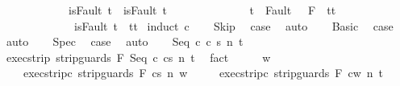 \begin{isabellebody}
\ \ \ \ \ \ \ \ \ \ \ \ {\isacharparenleft}isFault\ t\ {\isasymlongrightarrow}\ isFault\ t{\isacharprime}{\isacharparenright}\ {\isasymand}\ \isanewline
\ \ \ \ \ \ \ \ \ \ \ \ {\isacharparenleft}t{\isacharprime}\ {\isasymin}\ Fault\ {\isacharbackquote}\ {\isacharparenleft}{\isacharminus}\ F{\isacharparenright}\ {\isasymlongrightarrow}\ t{\isacharprime}{\isacharequal}t{\isacharparenright}\ {\isasymand}\isanewline
\ \ \ \ \ \ \ \ \ \ \ \ {\isacharparenleft}{\isasymnot}\ isFault\ t{\isacharprime}\ {\isasymlongrightarrow}\ t{\isacharprime}{\isacharequal}t{\isacharparenright}{\isachardoublequoteclose}\isanewline
%
\isadelimproof
%
\endisadelimproof
%
\isatagproof
{}\isamarkupfalse%
\ {\isacharparenleft}induct\ c{\isacharparenright}\isanewline
\ \ \isamarkupfalse%
\ Skip\ \isamarkupfalse%
\ {\isacharquery}case\ \isamarkupfalse%
\ auto\isanewline
{}\isamarkupfalse%
\isanewline
\ \ \isamarkupfalse%
\ Basic\ \isamarkupfalse%
\ {\isacharquery}case\ \isamarkupfalse%
\ auto\isanewline
{}\isamarkupfalse%
\isanewline
\ \ \isamarkupfalse%
\ Spec\ \isamarkupfalse%
\ {\isacharquery}case\ \isamarkupfalse%
\ auto\isanewline
{}\isamarkupfalse%
\isanewline
\ \ \isamarkupfalse%
\ {\isacharparenleft}Seq\ c{}\ c{}\ s\ n\ t{\isacharparenright}\isanewline
\ \ \isamarkupfalse%
\ exec{\isacharunderscore}strip{\isacharcolon}\ {\isachardoublequoteopen}{\isasymGamma}{\isasymturnstile}{\isasymlangle}strip{\isacharunderscore}guards\ F\ {\isacharparenleft}Seq\ c{}\ c{}{\isacharparenright}{\isacharcomma}s{\isasymrangle}\ {\isacharequal}n{\isasymRightarrow}\ t{\isachardoublequoteclose}\ \isamarkupfalse%
\ fact\isanewline
\ \ \isamarkupfalse%
\ \isamarkupfalse%
\ w\ \ \isanewline
\ \ \ \ exec{\isacharunderscore}strip{\isacharunderscore}c{}{\isacharcolon}\ {\isachardoublequoteopen}{\isasymGamma}{\isasymturnstile}{\isasymlangle}strip{\isacharunderscore}guards\ F\ c{}{\isacharcomma}s{\isasymrangle}\ {\isacharequal}n{\isasymRightarrow}\ w{\isachardoublequoteclose}\ \isanewline
\ \ \ \ exec{\isacharunderscore}strip{\isacharunderscore}c{}{\isacharcolon}\ {\isachardoublequoteopen}{\isasymGamma}{\isasymturnstile}{\isasymlangle}strip{\isacharunderscore}guards\ F\ c{}{\isacharcomma}w{\isasymrangle}\ {\isacharequal}n{\isasymRightarrow}\ t{\isachardoublequoteclose}\isanewline

\end{isabellebody}

